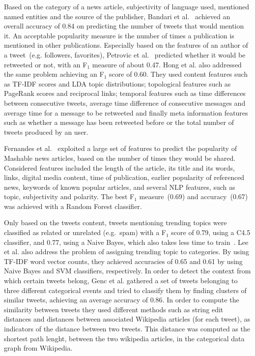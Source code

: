 Based on the category of a news article, subjectivity of language used, mentioned named entities and the source of the publisher, Bandari et al.~\citep{Bandari2012ForecastingPopularity} achieved an overall accuracy of 0.84 on predicting the number of tweets that would mention it. An acceptable popularity measure is the number of times a publication is mentioned in other publications. Especially based on the features of an author of a tweet~(e.g. followers, favorites), Petrovic et al.~\citep{Petrovic2011MsgProgagation} predicted whether it would be retweeted or not, with an F$_1$ measure of about 0.47. Hong et al. \citep{Hong2011PredictingTwitter} also addressed the same problem achieving an F$_1$ score of 0.60. They used content features such as TF-IDF scores and LDA topic distributions; topological features such as PageRank scores and reciprocal links; temporal features such as time differences between consecutive tweets, average time difference of consecutive messages and average time for a message to be retweeted and finally meta information features such as whether a message has been retweeted before or the total number of tweets produced by an user. 

Fernandes et al.~\citep{Fernandes2015PredictingPopularity} exploited a large set of features to predict the popularity of Mashable news articles, based on the number of times they would be shared.
Considered features included the length of the article, its title and its words, links, digital media content, time of publication, earlier popularity of referenced news, keywords of known popular articles, and several NLP features, such as topic, subjectivity and polarity.
The best F$_1$ measure~(0.69) and accuracy~(0.67) was achieved with a Random Forest classifier.

Only based on the tweets content, tweets mentioning trending topics were classified as related or unrelated (e.g.~spam) with a F$_1$ score of 0.79, using a C4.5 classifier, and 0.77, using a Naive Bayes, which also takes less time to train~\citep{Irani2010TrendStuff}. Lee et al. \cite{Lee2011TrendingTopic} also address the problem of assigning trending topic to categories. By using TF-IDF word vector counts, they achieved accuracies of 0.65 and 0.61 by using Naive Bayes and SVM classifiers, respectively.     
In order to detect the context from which certain tweets belong, Genc et al. \citep{Genc2011ClassifyingTweets} gathered a set of tweets belonging to three different categorical events and tried to classify them by finding clusters of similar tweets, achieving an average accuracy of 0.86. In order to compute the similarity between tweets they used different methods such as string edit distances and distances between associated Wikipedia articles (for each tweet), as indicators of the distance between two tweets. This distance was computed as the shortest path lenght, between the two wikipedia articles, in the categorical data graph from Wikipedia.

